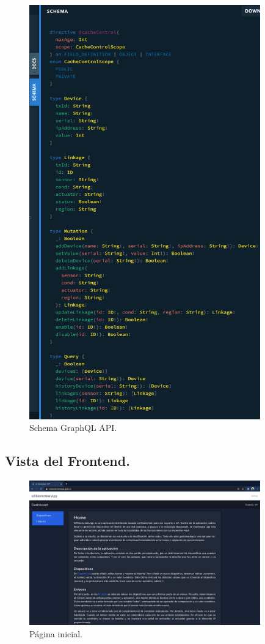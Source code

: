 \begin{figure}[ht!]
  \centering
  \includegraphics[width=10cm]{imagenes/desarrollo/web/api/graphql_schema}
  \caption{Schema GraphQL API.}
  \label{fig:graphql-schema}
\end{figure}

\subsection{Vista del Frontend.}

\begin{figure}[ht!]
  \centering
  \includegraphics[width=10cm]{imagenes/desarrollo/web/pagina_inicial}
  \caption{Página inicial.}
  \label{fig:pagina-inicial}
\end{figure}

